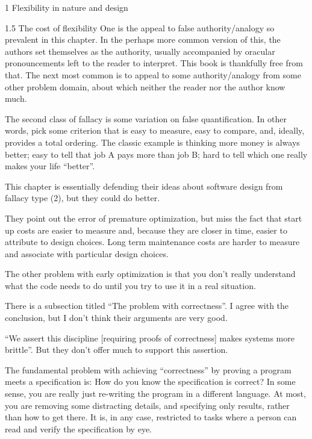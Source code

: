 \documentclass[12pt]{PalisadesLakesBook}
\begin{document}
\begin{plSection}{1 Flexibility in nature and design}
\begin{plSection}{1.5 The cost of flexibility}
One is the appeal to false authority/analogy so prevalent in this 
chapter. 
In the perhaps more common version of this, the authors set 
themselves as the authority, 
usually accompanied by oracular pronouncements left to the reader
to interpret.
This book is thankfully free from that.
The next most common is to appeal to some authority/analogy
from some other problem domain, about which 
neither the reader nor the author know much.

The second class of fallacy is some variation on false 
quantification. 
In other words, pick some criterion that is
easy to measure, easy to compare, and, ideally,
provides a total ordering. 
The classic example is thinking more money is always better;
easy to tell that job A pays more than job B;
hard to tell which one really makes your life ``better''.

This chapter is essentially defending their ideas about software
design from fallacy type (2),
but they could do better.

They point out the error of premature optimization,
but miss the fact that start up costs are easier to measure
and, because they are closer in time, easier to attribute to
design choices. 
Long term maintenance costs are harder to measure and
associate with particular design choices.

The other problem with early optimization is that you don't
really understand what the code needs to do until you try to
use it in a real situation.

There is a subsection titled ``The problem with correctness''.
I agree with the conclusion, but I don't think their arguments
are very good.

``We assert this discipline [requiring proofs of correctness]
makes systems more brittle''.
But they don't offer much to support this assertion.

The fundamental problem with achieving ``correctness''
by proving a program meets a specification is:
How do you know the specification is correct?
In some sense, you are really just re-writing the program
in a different language.
At most, you are removing some distracting details,
and specifying only results, rather than how to get there.
It is, in any case, restricted to tasks  where a person can
read and verify the specification by eye.

\end{plSection}%
\end{plSection}%
\end{document}
